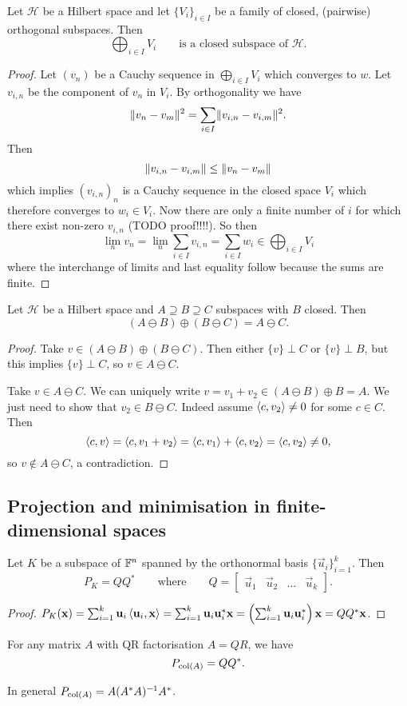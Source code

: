\begin{proposition} \label{directSumOrthogonalClosed}
Let $\mathcal{H}$ be a Hilbert space and let $\{V_i\}_{i\in I}$ be a family of closed, (pairwise) orthogonal subspaces. Then
\[ \bigoplus_{i\in I}V_i \qquad \text{is a closed subspace of $\mathcal{H}$.} \]
\end{proposition}
\begin{proof}
Let $(v_n)$ be a Cauchy sequence in $\bigoplus_{i\in I}V_i$ which converges to $w$. Let $v_{i,n}$ be the component of $v_n$ in $V_i$. By orthogonality we have
\[ \lVert v_n-v_m\rVert^2 = \sum_{i\in I}\lVert v_{i,n}-v_{i,m}\rVert^2. \]
Then
\[ \lVert v_{i,n}-v_{i,m}\rVert \leq \lVert v_n-v_m\rVert \]
which implies $(v_{i,n})_n$ is a Cauchy sequence in the closed space $V_i$ which therefore converges to $w_i\in V_i$. Now there are only a finite number of $i$ for which there exist non-zero $v_{i,n}$ (TODO proof!!!!). So then
\[ \lim_n v_n = \lim_n \sum_{i\in I}v_{i,n} = \sum_{i\in I}w_i \in \bigoplus_{i\in I}V_i \]
where the interchange of limits and last equality follow because the sums are finite.
\end{proof}

\begin{lemma} \label{cancellationOminus}
Let $\mathcal{H}$ be a Hilbert space and $A\supseteq B \supseteq C$ subspaces with $B$ closed. Then
\[ (A\ominus B)\oplus (B\ominus C) = A\ominus C.\]
\end{lemma}
\begin{proof}
Take $v\in(A\ominus B)\oplus (B\ominus C)$. Then either $\{v\}\perp C$ or $\{v\}\perp B$, but this implies $\{v\}\perp C$, so $v\in A\ominus C$.

Take $v\in A\ominus C$. We can uniquely write $v = v_1 + v_2 \in (A\ominus B)\oplus B = A$. We just need to show that $v_2\in B\ominus C$. Indeed assume $\left\langle c,v_2 \right\rangle\neq 0$ for some $c\in C$. Then
\[ \left\langle c, v \right\rangle = \left\langle c, v_1+v_2 \right\rangle = \left\langle c,v_1 \right\rangle+\left\langle c,v_2 \right\rangle = \left\langle c,v_2 \right\rangle \neq 0, \]
so $v\notin A\ominus C$, a contradiction.
\end{proof}

\subsection{Projection and minimisation in finite-dimensional spaces}

\begin{lemma}
Let $K$ be a subspace of $\mathbb{F}^n$ spanned by the orthonormal basis $\{\vec{u}_i\}_{i=1}^k$. Then
\[ P_K = QQ^* \qquad\text{where}\qquad Q = \begin{bmatrix}
\vec{u}_1 & \vec{u}_2 & \hdots & \vec{u}_k
\end{bmatrix}. \]
\end{lemma}
\begin{proof}
$P_K(\boldsymbol{\mathrm{x}}) = \sum_{i=1}^k\boldsymbol{\mathrm{u}}_i\left\langle \boldsymbol{\mathrm{u}}_i,\boldsymbol{\mathrm{x}} \right\rangle = \sum_{i=1}^k\boldsymbol{\mathrm{u}}_i \boldsymbol{\mathrm{u}}_i^*\boldsymbol{\mathrm{x}} = \left(\sum_{i=1}^k\boldsymbol{\mathrm{u}}_i \boldsymbol{\mathrm{u}}_i^*\right)\boldsymbol{\mathrm{x}} = QQ^*\boldsymbol{\mathrm{x}}$.
\end{proof}
\begin{corollary}
For any matrix $A$ with QR factorisation $A=QR$, we have
\[ P_{\operatorname{col}(A)} = QQ^*. \]
\end{corollary}
In general $P_{\operatorname{col}(A)} = A(A^*A)^{-1}A^*$.

